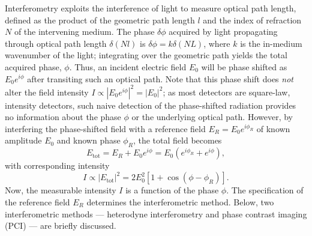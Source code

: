 Interferometry exploits the interference of light
to measure optical path length, defined as the product of
the geometric path length $l$ and
the index of refraction $N$ of the intervening medium.
The phase $\delta \phi$ acquired by light propagating through
optical path length $\delta(Nl)$ is
$\delta\phi = k \delta(NL)$, where
$k$ is the in-medium wavenumber of the light;
integrating over the geometric path
yields the total acquired phase, $\phi$.
Thus, an incident electric field $E_0$
will be phase shifted as $E_0 e^{i \phi}$
after transiting such an optical path.
Note that this phase shift does \emph{not} alter
the field intensity $I \propto |E_0 e^{i \phi}|^2 = |E_0|^2$;
as most detectors are square-law, intensity detectors,
such naive detection of the phase-shifted radiation
provides no information about the phase $\phi$
or the underlying optical path.
However, by interfering the phase-shifted field with
a reference field $E_R = E_0 e^{i \phi_R}$ of
known amplitude $E_0$ and known phase $\phi_R$,
the total field becomes
\begin{equation}
  E_{\text{tot}}
  =
  E_R + E_0 e^{i \phi}
  =
  E_0 \left( e^{i \phi_R} + e^{i \phi} \right),
  \label{eq:Introduction:OpticalInterferometry:generic_interferometer_electric_field}
\end{equation}
with corresponding intensity
\begin{equation}
  I
  \propto
  |E_{\text{tot}}|^2
  =
  2 E_0^2 \left[
    1 + \cos\left( \phi - \phi_R \right)
  \right].
  \label{eq:Introduction:OpticalInterferometry:generic_interferometer_intensity}
\end{equation}
Now, the measurable intensity $I$
is a function of the phase $\phi$.
The specification of the reference field $E_R$
determines the interferometric method.
Below, two interferometric methods ---
heterodyne interferometry and phase contrast imaging (PCI) ---
are briefly discussed.


